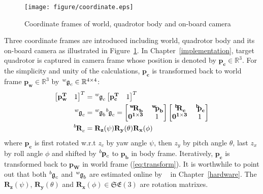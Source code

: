 \begin{figure}[htb]
  \centering
  \texttt{[image: figure/coordinate.eps]}
  \caption{Coordinate frames of world, quadrotor body and on-board camera}
  \label{fig:coordinate}
\end{figure}
Three coordinate frames are introduced including world, quadrotor body and its on-board camera as illustrated in Figure~\ref{fig:coordinate}. In Chapter~\ref{implementation}, target quadrotor is captured in camera frame whose position is denoted by $\mathbf{p_c}\in\mathbb{R}^3$. For the simplicity and unity of the calculations, $\mathbf{p_c}$ is transformed back to world frame $\mathbf{p_w}\in\mathbb{R}^3$ by $\tensor*[^w]{\mathfrak{g}}{_c}\in\mathbb{R}^{4\times4}$:
\begin{equation}\label{eq:transform}
\begin{aligned}
\begin{bmatrix}\mathbf{p^T_w}&1\end{bmatrix}^T&=\tensor*[^w]{\mathfrak{g}}{_c}\begin{bmatrix}\mathbf{p^T_c}&1\end{bmatrix}^T\\
\tensor*[^w]{\mathfrak{g}}{_c}&=\tensor*[^w]{\mathfrak{g}}{_b}\tensor*[^b]{\mathfrak{g}}{_c}=\begin{bmatrix}\mathbf{\tensor*[^w]{R}{_b}}&\mathbf{\tensor*[^w]{p}{_b}}\\\mathbf{0^{1\times3}}&1\end{bmatrix}
\begin{bmatrix}\mathbf{\tensor*[^b]{R}{_c}}&\mathbf{\tensor*[^b]{p}{_c}}\\\mathbf{0^{1\times3}}&1\end{bmatrix}\\
\tensor*[^b]{\mathbf{R}}{_c}&=\mathbf{R_z}(\psi)\mathbf{R_y}(\theta)\mathbf{R_x}(\phi)
\end{aligned}
\end{equation}
where $\mathbf{p_c}$ is first rotated w.r.t $z_c$ by yaw angle $\psi$, then $z_y$ by pitch angle $\theta$, last $z_x$ by roll angle $\phi$ and shifted by $\tensor*[^b]{\mathbf{p}}{_c}$ to $\mathbf{p_b}$ in body frame. Iteratively, $\mathbf{p_c}$ is transformed back to $\mathbf{p_W}$ in world frame (\ref{eq:transform}). It is worthwhile to point out that both $\tensor*[^b]{\mathfrak{g}}{_c}$ and $\tensor*[^w]{\mathfrak{g}}{_b}$ are estimated online by ~\cite{VINS} in Chapter~\ref{hardware}. The $\mathbf{R_z}(\psi)$, $\mathbf{R_y}(\theta)$ and $\mathbf{R_x}(\phi)\in\mathfrak{SE(3)}$ are rotation matrixes.

